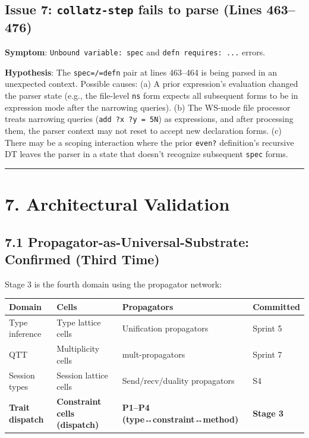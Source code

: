 \documentclass[11pt]{article}
\begin{document}
\subsection{Issue 7: \texttt{collatz-step} fails to parse (Lines 463–476)}
\label{sec:org87ce3b3}

\textbf{Symptom}: \texttt{Unbound variable: spec} and \texttt{defn requires: ...} errors.

\textbf{Hypothesis}: The \texttt{spec=/=defn} pair at lines 463–464 is being parsed in an unexpected
context. Possible causes: (a) A prior expression's evaluation changed the parser
state (e.g., the file-level \texttt{ns} form expects all subsequent forms to be in expression
mode after the narrowing queries). (b) The WS-mode file processor treats narrowing
queries (\texttt{add ?x ?y = 5N}) as expressions, and after processing them, the parser
context may not reset to accept new declaration forms. (c) There may be a scoping
interaction where the prior \texttt{even?} definition's recursive DT leaves the parser in
a state that doesn't recognize subsequent \texttt{spec} forms.

\noindent\rule{\textwidth}{0.5pt}
\section{7. Architectural Validation}
\label{sec:org588a2fb}

\subsection{7.1 Propagator-as-Universal-Substrate: Confirmed (Third Time)}
\label{sec:orgf4def67}

Stage 3 is the fourth domain using the propagator network:

\begin{center}
\begin{tabular}{llll}
Domain & Cells & Propagators & Committed\\
\hline
Type inference & Type lattice cells & Unification propagators & Sprint 5\\
QTT & Multiplicity cells & mult-propagators & Sprint 7\\
Session types & Session lattice cells & Send/recv/duality propagators & S4\\
\textbf{Trait dispatch} & \textbf{Constraint cells (dispatch)} & \textbf{P1–P4 (type↔constraint↔method)} & \textbf{Stage 3}\\
\end{tabular}
\end{center}
\end{document}
